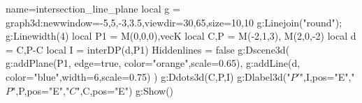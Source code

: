 \documentclass[12pt]{standalone}
\begin{document}
\begin{luadraw}{name=intersection_line_plane}
 local g = graph3d:new{window={-5,5,-3,3.5},viewdir={30,65},size={10,10}}
g:Linejoin("round"); g:Linewidth(4)
local P1 = {M(0,0,0),vecK}
local C,P = M(-2,1,3), M(2,0,-2)
local d = {C,P-C}
local I = interDP(d,P1)
Hiddenlines = false
g:Dscene3d(
    g:addPlane(P1, {edge=true, color="orange",scale=0.65}),
    g:addLine(d, {color="blue",width=6,scale=0.75})
    )
     g:Ddots3d({C,P,I})
     g:Dlabel3d("$P'$",I,{pos="E"},"$P$",P,{pos="E"},"$C$",C,{pos="E"})
g:Show()
\end{luadraw}
\end{document}
